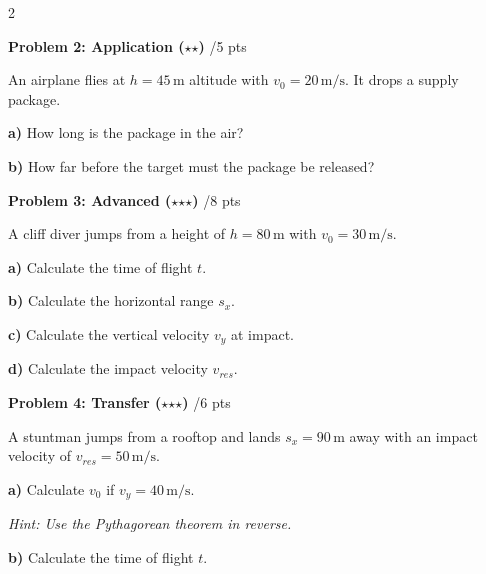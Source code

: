 \documentclass[10pt, a4paper]{article}
\newcommand{\fachfarbe}{physik}
\newcommand{\stmark}{$\star$}
\newcommand{\abschnitt}[1]{%
    \vspace{8pt}
    \noindent\textbf{\textcolor{\fachfarbe}{#1}}
    \vspace{4pt}
}
\newcommand{\punkte}[1]{\hfill\small\textcolor{grau}{/#1 pts}}
\begin{document}
\begin{multicols}{2}

\abschnitt{Problem 2: Application (\stmark\stmark)}\punkte{5}

An airplane flies at $h = 45\,\text{m}$ altitude with $v_0 = 20\,\text{m/s}$. It drops a supply package.

\textbf{a)} How long is the package in the air?

\vspace{1.8cm}

\textbf{b)} How far before the target must the package be released?

\vspace{1.8cm}


\abschnitt{Problem 3: Advanced (\stmark\stmark\stmark)}\punkte{8}

A cliff diver jumps from a height of $h = 80\,\text{m}$ with $v_0 = 30\,\text{m/s}$.

\textbf{a)} Calculate the time of flight $t$.

\vspace{1.5cm}

\textbf{b)} Calculate the horizontal range $s_x$.

\vspace{1.5cm}

\textbf{c)} Calculate the vertical velocity $v_y$ at impact.

\vspace{1.5cm}

\textbf{d)} Calculate the impact velocity $v_{res}$.

\vspace{1.5cm}


\abschnitt{Problem 4: Transfer (\stmark\stmark\stmark)}\punkte{6}

A stuntman jumps from a rooftop and lands $s_x = 90\,\text{m}$ away with an impact velocity of $v_{res} = 50\,\text{m/s}$.

\textbf{a)} Calculate $v_0$ if $v_y = 40\,\text{m/s}$.

\textit{Hint: Use the Pythagorean theorem in reverse.}

\vspace{2cm}

\textbf{b)} Calculate the time of flight $t$.

\vspace{1.5cm}

\end{multicols}
\end{document}
